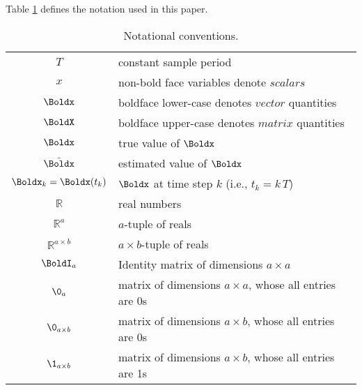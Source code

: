 Table \ref{table:notation} defines the notation used in this paper.


\begin{table}[bh]
	\centering
	\caption{Notational conventions.}
	\begin{tabular}[h]{|c|l|}
		\hline
		$T$				& constant sample period 			\T \\
		$x$ 			& non-bold face variables denote $scalars$ 			\T \\
		$\Boldx$ 		& boldface lower-case denotes $vector$ quantities	\T \\ 	
		$\BoldX$ 		& boldface upper-case denotes $matrix$ quantities	\T \\
		$\Boldx$ 		& true value of $\Boldx$ 							\T \\  	
		$\hat{\Boldx}$ 	& estimated value of $\Boldx$						\T \\	
		${\Boldx}_{k}=\Boldx(t_k)$ &  $\Boldx$ at time step $k$ (i.e., $t_k=k\,T$)	\T \\	
		$\mathbb{R}$ 	& real numbers										\T \\ 	
		$\mathbb{R}^a$ 	& $a$-tuple of reals								\T \\
		$\mathbb{R}^{a \times b}$ 	& $a \times b$-tuple of reals								\T \\
		$\BoldI_{a}$ 	& Identity matrix of dimensions $a \times a $ \T \\
		$\0_{a}$ 		& matrix of dimensions $a \times a $, whose all entries are 0s 	\T \\
		$\0_{a \times b}$ 	& matrix of dimensions $a \times b $, whose all entries are 0s 	\T \\
		$\1_{a \times b}$ 	& matrix of dimensions $a \times b $, whose all entries are 1s 	\T \\
		\hline
		
	\end{tabular}
	\label{table:notation}
\end{table}

\black